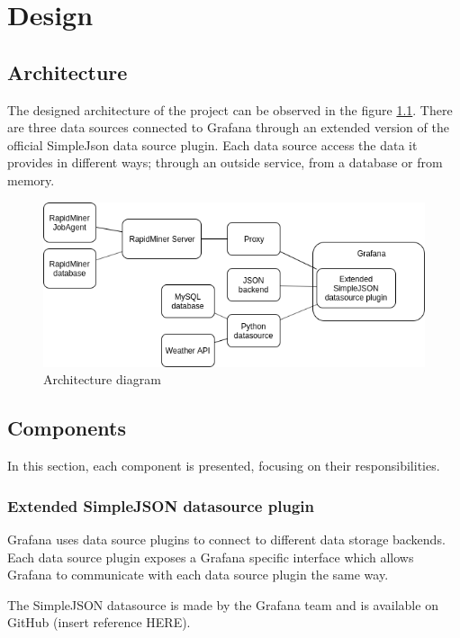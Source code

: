 \chapter{Design}

\section{Architecture}

The designed architecture of the project can be observed in the figure \ref{fig:arch}. There are three data sources connected to Grafana through an extended version of the official SimpleJson data source plugin. Each data source access the data it provides in different ways; through an outside service, from a database or from memory.

\begin{figure}[h]
	\centering
	\includegraphics[width=150mm, keepaspectratio]{figures/architecture.png}
	\caption{Architecture diagram}
	\label{fig:arch}
\end{figure}

\section{Components}

In this section, each component is presented, focusing on their responsibilities.

\subsection{Extended SimpleJSON datasource plugin}

Grafana uses data source plugins to connect to different data storage backends. Each data source plugin exposes a Grafana specific interface which allows Grafana to communicate with each data source plugin the same way.

The SimpleJSON datasource is made by the Grafana team and is available on GitHub (insert reference HERE).

